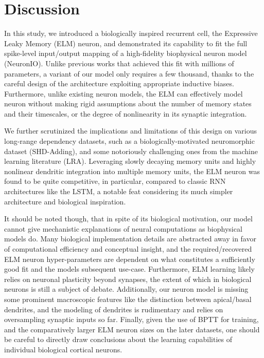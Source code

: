 \documentclass{article} \usepackage{iclr2024_doc_style,times}
\begin{document}
\vspace{-3pt} \section{Discussion}
\label{discussion}
\vspace{-3pt}

In this study, we introduced a biologically inspired recurrent cell, the Expressive Leaky Memory (ELM) neuron, and demonstrated its capability to fit the full spike-level input/output mapping of a high-fidelity biophysical neuron model (NeuronIO). Unlike previous works that achieved this fit with millions of parameters, a variant of our model only requires a few thousand, thanks to the careful design of the architecture exploiting appropriate inductive biases. Furthermore, unlike existing neuron models, the ELM can effectively model neuron without making rigid assumptions about the number of memory states and their timescales, or the degree of nonlinearity in its synaptic integration.

We further scrutinized the implications and limitations of this design on various long-range dependency datasets, such as a biologically-motivated neuromorphic dataset (SHD-Adding), and some notoriously challenging ones from the machine learning literature (LRA). Leveraging slowly decaying memory units and highly nonlinear dendritic integration into multiple memory units, the ELM neuron was found to be quite competitive, in particular, compared to classic RNN architectures like the LSTM, a notable feat considering its much simpler architecture and biological inspiration.

It should be noted though, that in spite of its biological motivation, our model cannot give mechanistic explanations of neural computations as biophysical models do. Many biological implementation details are abstracted away in favor of computational efficiency and conceptual insight, and the required/recovered ELM neuron hyper-parameters are dependent on what constitutes a sufficiently good fit and the models subsequent use-case. Furthermore, ELM learning likely relies on neuronal plasticity beyond synapses, the extent of which in biological neurons is still a subject of debate. Additionally, our neuron model is missing some prominent macroscopic features like the distinction between apical/basal dendrites, and the modeling of dendrites is rudimentary and relies on oversampling synaptic inputs so far. Finally, given the use of BPTT for training, and the comparatively larger ELM neuron sizes on the later datasets, one should be careful to directly draw conclusions about the learning capabilities of individual biological cortical neurons.
\end{document}

